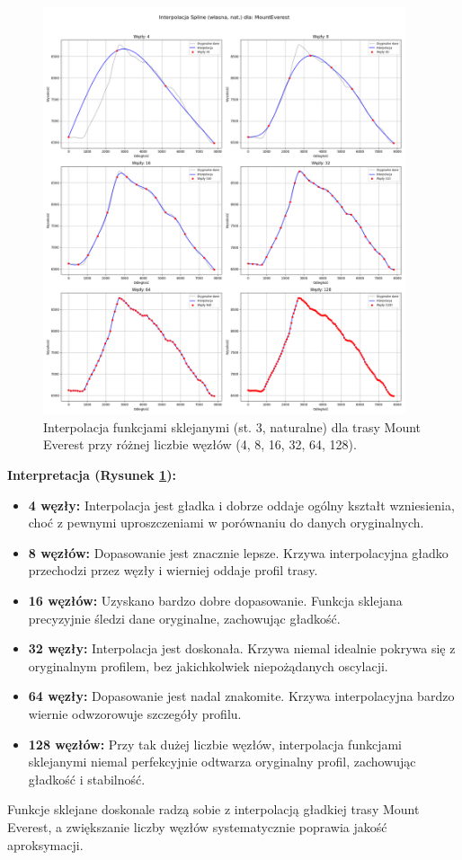 \documentclass[11pt,a4paper]{article}
\begin{document}
\begin{figure}[H]
    \centering
    \includegraphics[width=0.95\textwidth]{MountEverest_Spline_basic_subplots.png} %
    \caption{Interpolacja funkcjami sklejanymi (st. 3, naturalne) dla trasy Mount Everest przy różnej liczbie węzłów (4, 8, 16, 32, 64, 128).}
    \label{fig:spline_everest}
\end{figure}

\textbf{Interpretacja (Rysunek \ref{fig:spline_everest}):} 
\begin{itemize}
    \item \textbf{4 węzły:} Interpolacja jest gładka i dobrze oddaje ogólny kształt wzniesienia, choć z pewnymi uproszczeniami w porównaniu do danych oryginalnych.
    \item \textbf{8 węzłów:} Dopasowanie jest znacznie lepsze. Krzywa interpolacyjna gładko przechodzi przez węzły i wierniej oddaje profil trasy.
    \item \textbf{16 węzłów:} Uzyskano bardzo dobre dopasowanie. Funkcja sklejana precyzyjnie śledzi dane oryginalne, zachowując gładkość.
    \item \textbf{32 węzły:} Interpolacja jest doskonała. Krzywa niemal idealnie pokrywa się z oryginalnym profilem, bez jakichkolwiek niepożądanych oscylacji.
    \item \textbf{64 węzły:} Dopasowanie jest nadal znakomite. Krzywa interpolacyjna bardzo wiernie odwzorowuje szczegóły profilu.
    \item \textbf{128 węzłów:} Przy tak dużej liczbie węzłów, interpolacja funkcjami sklejanymi niemal perfekcyjnie odtwarza oryginalny profil, zachowując gładkość i stabilność.
\end{itemize}
Funkcje sklejane doskonale radzą sobie z interpolacją gładkiej trasy Mount Everest, a zwiększanie liczby węzłów systematycznie poprawia jakość aproksymacji.
\end{document}
